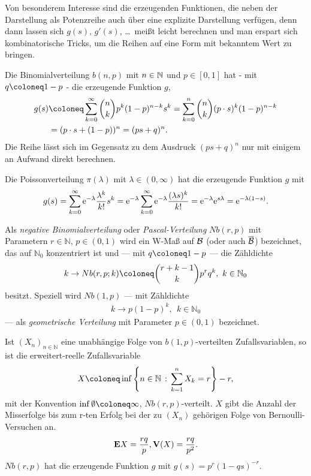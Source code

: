 Von besonderem Interesse sind die erzeugenden Funktionen, die neben der
Darstellung als Potenzreihe auch über eine explizite Darstellung verfügen, denn
dann lassen sich $g(s)$, $g'(s)$, \ldots\ meißt leicht berechnen und man
erspart sich kombinatorische Tricks, um die Reihen auf eine Form mit bekanntem
Wert zu bringen.


\begin{bem}[Bemerkungen.]
\begin{bemenum}
\item
Die Binomialverteilung $b(n,p)$ mit $n\in \mathbb{N}$ und $p\in [0,1]$ hat - mit
$q\defl 1-p$ - die erzeugende Funktion $g$,
\begin{align*}
g(s) &\defl \sum\limits_{k=0}^\infty \binom{n}{k} p^k(1-p)^{n-k} s^k
= \sum\limits_{k=0}^n \binom{n}{k} (p\cdot s)^k(1-p)^{n-k}\\ &
= (p\cdot s + (1-p))^n = (ps+q)^n.
\end{align*}
Die Reihe lässt sich im Gegensatz zu dem Ausdruck $(ps+q)^n$ nur mit einigem
an Aufwand direkt berechnen.

\item
Die Poissonverteilung $\pi(\lambda )$ mit $\lambda \in (0,\infty)$ hat die
erzeugende Funktion $g$ mit
\begin{align*}
g(s) = \sum\limits_{k=0}^\infty \mathrm{e}^{-\lambda} \frac{\lambda^k}{k!}s^k
= \mathrm{e}^{-\lambda} \sum\limits_{k=0}^\infty \mathrm{e}^{-\lambda} \frac{(\lambda s)^k}{k!}
= \mathrm{e}^{-\lambda}\mathrm{e}^{s\lambda} = \mathrm{e}^{-\lambda(1-s)}. 
\end{align*}
\item
Als \emph{negative Binomialverteilung} oder \emph{Pascal-Verteilung}
$Nb(r,p)$ mit Parametern
$r\in \mathbb{N}$, $p\in (0,1)$ wird ein W-Maß auf ${\mathcal{B}}$ (oder auch
$\overline{{\mathcal{B}}}$)  bezeichnet, das auf $\mathbb{N}_{0}$ konzentriert ist
und --- mit $q\defl 1-p$ --- die Zähldichte
\begin{align*}
k \to Nb (r,p;k) \defl {r+k-1\choose k} p^ {r}q^ {k},\,\, k\in \mathbb{N}_{0}
\end{align*}
besitzt. Speziell wird $Nb(1,p)$ --- mit Zähldichte
\begin{align*}
k\to p(1-p)^ {k}, \;\, k\in \mathbb{N}_{0}
\end{align*}
--- als \emph{geometrische Verteilung} mit Parameter $p\in (0,1)$
bezeichnet.

Ist $(X_{n})_{n\in \mathbb{N}}$ eine unabhängige Folge von $b(1,p)$-verteilten Zufallsvariablen,
so ist die erweitert-reelle Zufallsvariable
\begin{align*}
X\defl \inf\setdef{n\in\N}{\sum\limits^{n}_{k=1} X_{k}=r} -r,
\end{align*}
mit der Konvention $ \inf \emptyset \defl\infty$, $Nb(r,p)$-verteilt. $X$ gibt die
Anzahl der Misserfolge bis zum r-ten Erfolg bei der zu $(X_{n})$ gehörigen
Folge von Bernoulli-Versuchen an.
\begin{align*}
\textbf{E} X ={\dfrac{rq}{p}}, \textbf{V}(X) ={\dfrac{rq}{p^ {2}}}.
\end{align*}
$Nb(r,p)$ hat die erzeugende Funktion $g$ mit $g(s) =p^ {r}(1-qs)^
{-r}$.\maphere
\end{bemenum}
\end{bem}

